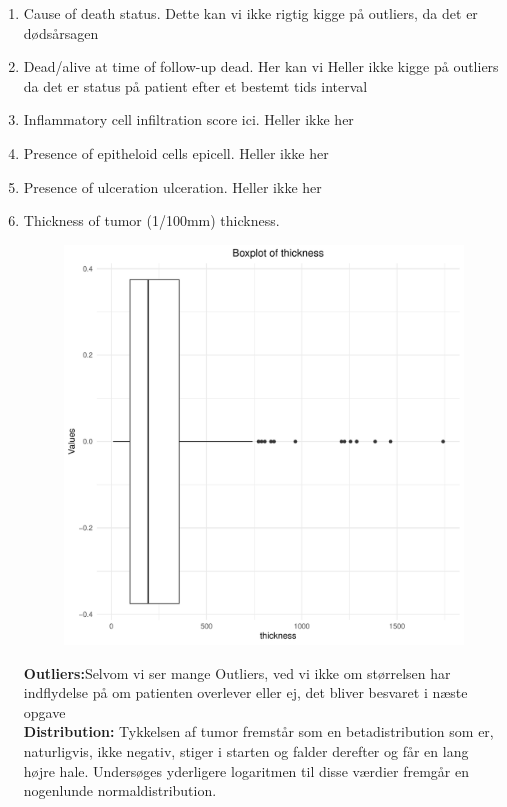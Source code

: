 \begin{enumerate}
\item Cause of death status. \newline
Dette kan vi ikke rigtig kigge på outliers, da det er dødsårsagen 
\item Dead/alive at time of follow-up dead. \newline
Her kan vi Heller ikke kigge på outliers da det er status på patient efter et bestemt tids interval
\item Inflammatory cell infiltration score ici. \newline
Heller ikke her
\item Presence of epitheloid cells epicell. \newline
Heller ikke her
\item Presence of ulceration ulceration. \newline
Heller ikke her
\item Thickness of tumor (1/100mm) thickness.
\newline
\begin{figure}[h]
    \centering
    \includegraphics[width=0.5\linewidth]{Basses_kode/Billeder_duration/Boxplot_of_ thickness .pdf}
\end{figure}
\textbf{Outliers:}Selvom vi ser mange Outliers, ved vi ikke om størrelsen har indflydelse på om patienten overlever eller ej, det bliver besvaret i næste opgave\\
\textbf{Distribution: } Tykkelsen af tumor fremstår som en betadistribution som er, naturligvis, ikke negativ, stiger i starten og falder derefter og får en lang højre hale. Undersøges yderligere logaritmen til disse værdier fremgår en nogenlunde normaldistribution.\\


\end{enumerate}
